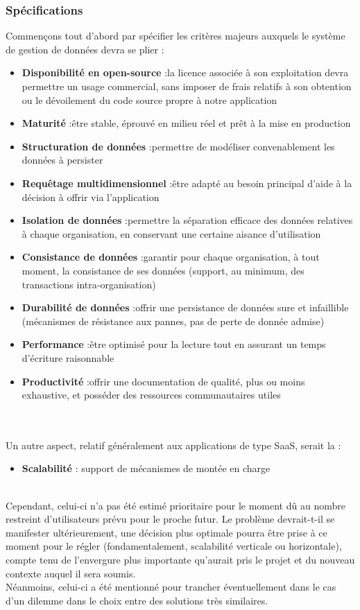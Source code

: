 \begin{spacing}{1.5}
\subsubsection{Spécifications}%
Commençons tout d’abord par spécifier les critères majeurs auxquels le système de gestion de données devra se plier :
\begin{itemize}
	\item \textbf{Disponibilité en open-source} :la licence associée à son exploitation devra permettre un usage commercial, sans imposer de frais relatifs à son obtention ou le dévoilement du code source propre à notre application
	\item \textbf{Maturité} :être stable, éprouvé en milieu réel et prêt à la mise en production
	\item \textbf{Structuration de données} :permettre de modéliser convenablement les données à persister
	\item \textbf{Requêtage multidimensionnel} :être adapté au besoin principal d’aide à la décision à offrir via l’application
	\item \textbf{Isolation de données} :permettre la séparation efficace des données relatives à chaque organisation, en conservant une certaine aisance d’utilisation
	\item \textbf{Consistance de données} :garantir pour chaque organisation, à tout moment, la consistance de ses données (support, au minimum, des transactions intra-organisation)
	\item \textbf{Durabilité de données} :offrir une persistance de données sure et infaillible (mécanismes de résistance aux pannes, pas de perte de donnée admise)
	\item \textbf{Performance} :être optimisé pour la lecture tout en assurant un temps d’écriture raisonnable
	\item \textbf{Productivité} :offrir une documentation de qualité, plus ou moins exhaustive, et posséder des ressources communautaires utiles
\end{itemize}
\\
\\
Un autre aspect, relatif généralement aux applications de type SaaS, serait la :
\begin{itemize}
	\item \textbf{Scalabilité} : support de mécanismes de montée en charge
\end{itemize}
\\
Cependant, celui-ci n’a pas été estimé prioritaire pour le moment dû au nombre restreint d’utilisateurs prévu pour le proche futur. 
Le problème devrait-t-il se manifester ultérieurement, une décision plus optimale pourra être prise à ce moment pour le régler (fondamentalement, scalabilité verticale ou horizontale), compte tenu de l’envergure plus importante qu’aurait pris le projet et du nouveau contexte auquel il sera soumis.\\
Néanmoins, celui-ci a été mentionné pour trancher éventuellement dans le cas d’un dilemme dans le choix entre des solutions très similaires.


\end{spacing}
